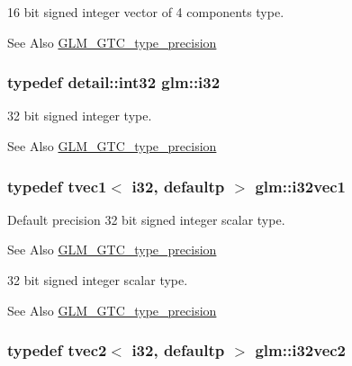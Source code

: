 16 bit signed integer vector of 4 components type. \begin{DoxySeeAlso}{See Also}
\hyperlink{group__gtc__type__precision}{G\-L\-M\-\_\-\-G\-T\-C\-\_\-type\-\_\-precision} 
\end{DoxySeeAlso}
\hypertarget{group__gtc__type__precision_ga1d8ed5c43e91ea7d4528389da4fa9524}{
\subsubsection[{i32}]{\setlength{\rightskip}{0pt plus 5cm}typedef detail\-::int32 {\bf glm\-::i32}}}\label{group__gtc__type__precision_ga1d8ed5c43e91ea7d4528389da4fa9524}
32 bit signed integer type. \begin{DoxySeeAlso}{See Also}
\hyperlink{group__gtc__type__precision}{G\-L\-M\-\_\-\-G\-T\-C\-\_\-type\-\_\-precision} 
\end{DoxySeeAlso}
\hypertarget{group__gtc__type__precision_ga05a766bbe2ad0791ed0081baac492da7}{
\subsubsection[{i32vec1}]{\setlength{\rightskip}{0pt plus 5cm}typedef tvec1$<$ i32, defaultp $>$ {\bf glm\-::i32vec1}}}\label{group__gtc__type__precision_ga05a766bbe2ad0791ed0081baac492da7}
Default precision 32 bit signed integer scalar type. \begin{DoxySeeAlso}{See Also}
\hyperlink{group__gtc__type__precision}{G\-L\-M\-\_\-\-G\-T\-C\-\_\-type\-\_\-precision}
\end{DoxySeeAlso}
32 bit signed integer scalar type. \begin{DoxySeeAlso}{See Also}
\hyperlink{group__gtc__type__precision}{G\-L\-M\-\_\-\-G\-T\-C\-\_\-type\-\_\-precision} 
\end{DoxySeeAlso}
\hypertarget{group__gtc__type__precision_ga25820e641988fe33b075d80434872d02}{
\subsubsection[{i32vec2}]{\setlength{\rightskip}{0pt plus 5cm}typedef tvec2$<$ i32, defaultp $>$ {\bf glm\-::i32vec2}}}\label{group__gtc__type__precision_ga25820e641988fe33b075d80434872d02}
